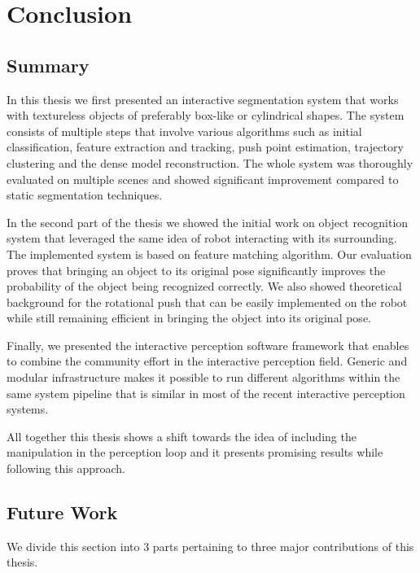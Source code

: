 \chapter{Conclusion}
\label{chapter:conclusion}

\section{Summary}

In this thesis we first presented an interactive segmentation system that works with textureless objects of preferably box-like or cylindrical shapes. The system consists of multiple steps that involve various algorithms such as initial classification, feature extraction and tracking, push point estimation, trajectory clustering and the dense model reconstruction. The whole system was thoroughly evaluated on multiple scenes and showed significant improvement compared to static segmentation techniques.

In the second part of the thesis we showed the initial work on object recognition system that leveraged the same idea of robot interacting with its surrounding. The implemented system is based on feature matching algorithm. Our evaluation proves that bringing an object to its original pose significantly improves the probability of the object being recognized correctly. We also showed theoretical background for the rotational push that can be easily implemented on the robot while still remaining efficient in bringing the object into its original pose. 

Finally, we presented the interactive perception software framework that enables to combine the community effort in the interactive perception field. Generic and modular infrastructure makes it possible to run different algorithms within the same system pipeline that is similar in most of the recent interactive perception systems.

All together this thesis shows a shift towards the idea of including the manipulation in the perception loop and it presents promising results while following this approach. 


\section{Future Work}
We divide this section into 3 parts pertaining to three major contributions of this thesis.

